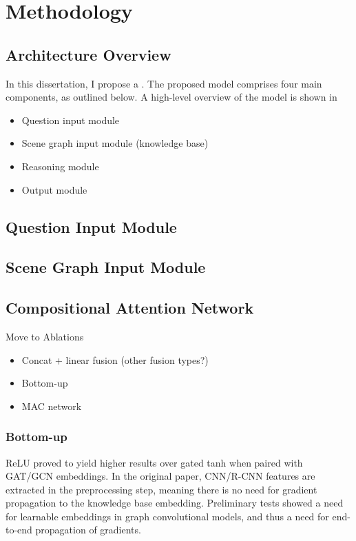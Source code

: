 \chapter{Methodology}
\label{chapter:methodology}

\section{Architecture Overview}
\label{section:architecture_overview}

In this dissertation, I propose a . The proposed model comprises four main components, as outlined below. A high-level overview of the model is shown in \figureautorefname{ \ref{TODO}}

\begin{itemize}
  \item Question input module
  \item Scene graph input module (knowledge base)
  \item Reasoning module
  \item Output module
\end{itemize}

\section{Question Input Module}
\label{section:question_input_module}

\section{Scene Graph Input Module}
\label{section:scene_graph_input_module}

\section{Compositional Attention Network}
\label{section:compositional_attention_network}

{\color{red}

Move to Ablations

\begin{itemize}
  \item Concat + linear fusion (other fusion types?)
  \item Bottom-up
  \item MAC network
\end{itemize}

\subsection{Bottom-up}
\label{subsection:bottom_up}
 ReLU proved to yield higher results over gated tanh when paired with GAT/GCN embeddings. In the original paper, CNN/R-CNN features are extracted in the preprocessing step, meaning there is no need for gradient propagation to the knowledge base embedding. Preliminary tests showed a need for learnable embeddings in graph convolutional models, and thus a need for end-to-end propagation of gradients.}


